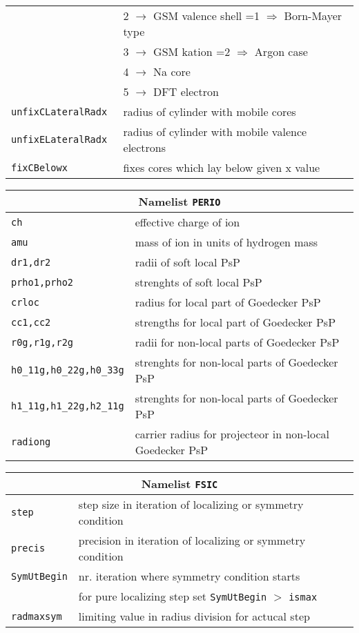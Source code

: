 \documentclass[12pt]{article}
\begin{document}
\begin{tabular}{ll}
{\tt                  }& 2   $\rightarrow$ GSM valence shell    =1 $\Longrightarrow$ Born-Mayer type\\
{\tt                  }& 3   $\rightarrow$ GSM kation                   =2 $\Longrightarrow$ Argon case\\
{\tt                  }& 4   $\rightarrow$ Na core\\
{\tt                  }& 5   $\rightarrow$ DFT electron\\
{\tt unfixCLateralRadx  }& radius of cylinder with mobile cores \\
{\tt unfixELateralRadx  }& radius of cylinder with mobile valence electrons\\
{\tt fixCBelowx       }&   fixes cores which lay below given x value\\
\hline
\end{tabular}



\begin{tabular}{ll}
\hline
\multicolumn{2}{c}{Namelist {\tt PERIO}} in {\tt for005.<name>} \\
\hline
{\tt ch}& effective charge of ion \\
{\tt amu}& mass of ion in units of hydrogen mass\\
{\tt dr1,dr2}& radii of soft local PsP\\
{\tt prho1,prho2}& strenghts of soft local PsP\\
{\tt crloc}& radius for local part of Goedecker PsP\\
{\tt cc1,cc2}& strengths for local part of  Goedecker PsP\\
{\tt r0g,r1g,r2g}& radii for non-local parts of  Goedecker PsP\\
{\tt h0\_11g,h0\_22g,h0\_33g}& 
  strenghts for non-local parts of  Goedecker PsP\\
{\tt h1\_11g,h1\_22g,h2\_11g}&
  strenghts for non-local parts of  Goedecker PsP\\
{\tt radiong}& carrier radius for projecteor in non-local Goedecker PsP\\
\hline
\end{tabular}


\begin{tabular}{ll}
\hline
\multicolumn{2}{c}{Namelist {\tt FSIC}} in {\tt for005.<name>} \\
\hline
{\tt step}& step size in iteration of localizing or symmetry condition \\
{\tt precis}& precision in iteration of localizing or symmetry condition \\
{\tt SymUtBegin}& nr. iteration where symmetry condition starts\\
 &               for pure localizing step set {\tt  SymUtBegin} $>$ {\tt ismax}\\
{\tt radmaxsym}& limiting value in radius division  for actucal step\\
\hline
\end{tabular}
\end{document}
